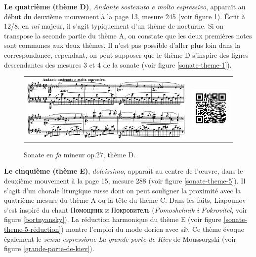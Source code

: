 \textbf{Le quatrième (thème D)}, \emph{Andante sostenuto e molto espressivo}, apparaît au début du deuxième mouvement à la page 13, mesure 245 (voir figure \ref{sonate-theme-4}). Écrit à 12/8, en \emph{mi} majeur, il s'agit typiquement d'un thème de nocturne. Si on transpose la seconde partie du thème A, on constate que les deux premières notes sont communes aux deux thèmes. Il n'est pas possible d'aller plus loin dans la correspondance, cependant, on peut supposer que le thème D s'inspire des lignes descendantes des mesures 3 et 4 de la sonate (voir figure \ref{sonate-theme-1}).

\begin{figure}[!ht]
  \begin{bigcenter}
    \begin{tabular}{lr}
      \includegraphics[width=12.5cm, keepaspectratio]{sonate-theme-D.png}
      &
      \includegraphics[width=3cm, keepaspectratio]{op1-qr.png}
    \end{tabular}
  \end{bigcenter}
  \caption{\label{sonate-theme-4}Sonate en \emph{fa} mineur op.27, thème D.}
\end{figure}

\textbf{Le cinquième (thème E)}, \emph{dolcissimo},  apparaît au centre de l'œuvre, dans le deuxième mouvement à la page 15, mesure 288 (voir figure \ref{sonate-theme-5}). Il s'agit d'un chorale liturgique russe dont on peut souligner la proximité avec la quatrième mesure du thème A ou la tête du thème C. Dans les faits, Liapounov s'est inspiré du chant \foreignlanguage{russian}{Помощник и Покровитель} (\emph{Pomoshchnik i Pokrovitel}, voir figure \ref{bortnyansky}). La réduction harmonique du thème E (voir figure \ref{sonate-theme-5-réduction}) montre l'emploi du mode dorien avec si$\flat$. Ce thème évoque également le \emph{senza espressione} \emph{La grande porte de Kiev} de Moussorgski (voir figure \ref{grande-porte-de-kiev}).\\

